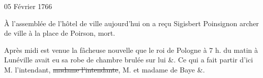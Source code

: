                      \begin{diary}{05 Février 1766}{}

                         À l'assemblée de l'hôtel de ville aujourd'hui
                           on a reçu Sigisbert
                              Poinsignon archer de ville
                           à la place de Poirson, mort. \bigskip


                         Après midi est venue la fâcheuse
                           nouvelle
                           que le roi de Pologne à 7 h. du matin à Lunéville
                           avait eu sa robe de chambre brulée sur lui \&.
                           Ce qui a fait partir d'ici M.
                              l'intendant, \sout{madame
                                 l'intendante}, M. et madame de Baye \&. \bigskip


                     \end{diary}

